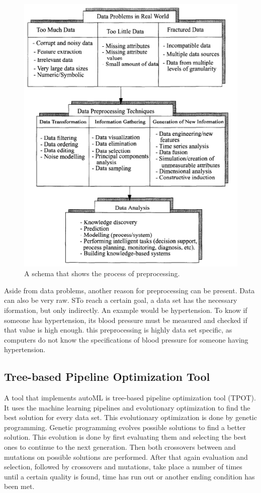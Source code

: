 \documentclass[10pt,a4paper]{article}
\begin{document}
 	\begin{figure}[h!]
 		\includegraphics[scale=1]{DataPreprocessing.png}
 		\caption{A schema that shows the process of preprocessing. \cite{famili1997data}}
 		\label{fig:DataPreprocessing}
 	\end{figure}
 	
 	Aside from data problems, another reason for preprocessing can be present. \cite{famili1997data} Data can also be very raw. STo reach a certain goal, a data set has the necessary iformation, but only indirectly. An example would be hypertension. To know if someone has hypertension, its blood pressure must be measured and checked if that value is high enough. this preprocessing is highly data set specific, as computers do not know the specifications of blood pressure for someone having hypertension. 
 	
	\subsection{Tree-based Pipeline Optimization Tool}
	\label{subsec:TPOT}
	
	A tool that implements autoML is tree-based pipeline optimization tool (TPOT). It uses the machine learning pipelines and evolutionary optimization to find the best solution for every data set. This evolutionary optimization is done by genetic programming. Genetic programming evolves possible solutions to find a better solution. This evolution is done by first evaluating them and selecting the best ones to continue to the next generation. Then both crossovers between and mutations on possible solutions are performed. After that again evaluation and selection, followed by crossovers and mutations, take place a number of times until a certain quality is found, time has run out or another ending condition has been met.
	
\end{document}
